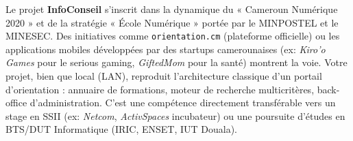 \documentclass[11pt]{article}
\begin{document}
\begin{savaistu}
Le projet \textbf{InfoConseil} s'inscrit dans la dynamique du « Cameroun Numérique 2020 » et de la stratégie « École Numérique » portée par le MINPOSTEL et le MINESEC. Des initiatives comme \texttt{orientation.cm} (plateforme officielle) ou les applications mobiles développées par des startups camerounaises (ex: \emph{Kiro'o Games} pour le serious gaming, \emph{GiftedMom} pour la santé) montrent la voie. Votre projet, bien que local (LAN), reproduit l'architecture classique d'un portail d'orientation : annuaire de formations, moteur de recherche multicritères, back-office d'administration. C'est une compétence directement transférable vers un stage en SSII (ex: \emph{Netcom}, \emph{ActivSpaces} incubateur) ou une poursuite d'études en BTS/DUT Informatique (IRIC, ENSET, IUT Douala).
\end{savaistu}
\end{document}
